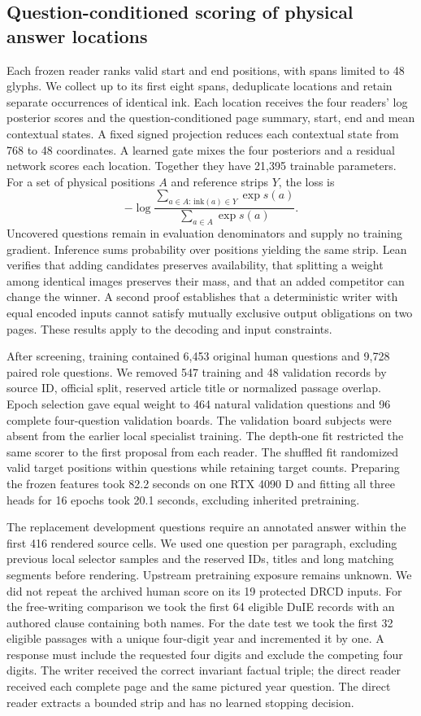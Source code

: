 \subsection*{Question-conditioned scoring of physical answer locations}
Each frozen reader ranks valid start and end positions, with spans limited to 48 glyphs. We collect up to its first eight spans, deduplicate locations and retain separate occurrences of identical ink. Each location receives the four readers' log posterior scores and the question-conditioned page summary, start, end and mean contextual states. A fixed signed projection reduces each contextual state from 768 to 48 coordinates. A learned gate mixes the four posteriors and a residual network scores each location. Together they have 21,395 trainable parameters. For a set of physical positions $A$ and reference strips $Y$, the loss is
\[
-\log \frac{\sum_{a\in A:\,\mathrm{ink}(a)\in Y}\exp s(a)}{\sum_{a\in A}\exp s(a)} .
\]
Uncovered questions remain in evaluation denominators and supply no training gradient. Inference sums probability over positions yielding the same strip. Lean verifies that adding candidates preserves availability, that splitting a weight among identical images preserves their mass, and that an added competitor can change the winner. A second proof establishes that a deterministic writer with equal encoded inputs cannot satisfy mutually exclusive output obligations on two pages. These results apply to the decoding and input constraints.

After screening, training contained 6,453 original human questions and 9,728 paired role questions. We removed 547 training and 48 validation records by source ID, official split, reserved article title or normalized passage overlap. Epoch selection gave equal weight to 464 natural validation questions and 96 complete four-question validation boards. The validation board subjects were absent from the earlier local specialist training. The depth-one fit restricted the same scorer to the first proposal from each reader. The shuffled fit randomized valid target positions within questions while retaining target counts. Preparing the frozen features took 82.2 seconds on one RTX 4090 D and fitting all three heads for 16 epochs took 20.1 seconds, excluding inherited pretraining.

The replacement development questions require an annotated answer within the first 416 rendered source cells. We used one question per paragraph, excluding previous local selector samples and the reserved IDs, titles and long matching segments before rendering. Upstream pretraining exposure remains unknown. We did not repeat the archived human score on its 19 protected DRCD inputs. For the free-writing comparison we took the first 64 eligible DuIE records with an authored clause containing both names. For the date test we took the first 32 eligible passages with a unique four-digit year and incremented it by one. A response must include the requested four digits and exclude the competing four digits. The writer received the correct invariant factual triple; the direct reader received each complete page and the same pictured year question. The direct reader extracts a bounded strip and has no learned stopping decision.

